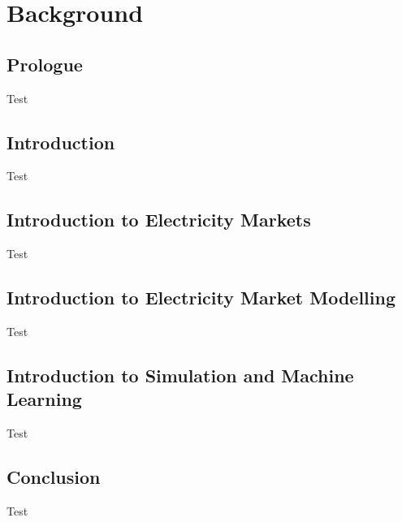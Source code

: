 
\chapter{Background}
\label{chapter:background}
\ifpdf
    \graphicspath{{Chapter2/Figs/Raster/}{Chapter2/Figs/PDF/}{Chapter2/Figs/}}
\else
    \graphicspath{{Chapter2/Figs/Vector/}{Chapter2/Figs/}}
\fi


\section{Prologue}

Test

\section{Introduction}

Test

\section{Introduction to Electricity Markets}

Test

\section{Introduction to Electricity Market Modelling}

Test

\section{Introduction to Simulation and Machine Learning}

Test

\section{Conclusion}

Test